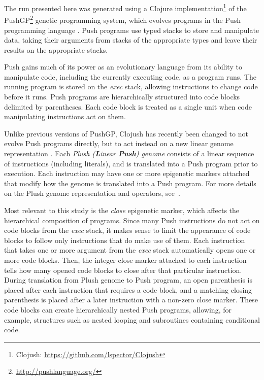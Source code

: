 \documentclass[graybox]{svmult}
\begin{document}


The run presented here was generated using a Clojure implementation\footnote{Clojush: \url{https://github.com/lspector/Clojush}} of the PushGP\footnote{\url{http://pushlanguage.org/}} genetic programming system, which evolves programs in the Push programming language \cite{spector:2002:GPEM, 1068292}. Push programs use typed stacks to store and manipulate data, taking their arguments from stacks of the appropriate types and leave their results on the appropriate stacks.

Push gains much of its power as an evolutionary language from its ability to manipulate code, including the currently executing code, as a program runs. The running program is stored on the \textit{exec} stack, allowing instructions to change code before it runs. Push programs are hierarchically structured into code blocks delimited by parentheses. Each code block is treated as a single unit when code manipulating instructions act on them.

Unlike previous versions of PushGP, Clojush has recently been changed to not evolve 
Push programs directly, but to act instead on a new linear genome representation 
\cite{Helmuth:2016:GPTP}. Each \textit{Plush (\textbf{L}inear 
	\textbf{Push}) genome} consists of a linear sequence of instructions (including 
literals), and is translated into a Push program prior to execution. Each 
instruction may have one or more epigenetic markers attached that modify how 
the genome is translated into a Push program. For more details on the Plush genome
representation and operators, see~\cite{Helmuth:2016:GPTP}.

Most relevant to this study is the \textit{close} epigenetic marker, which 
affects the hierarchical composition of programs. Since many Push instructions 
do not act on code blocks from the \textit{exec} stack, it 
makes sense to limit the appearance of code blocks to follow only instructions 
that do make use of them. Each instruction that takes one or more argument from 
the \textit{exec} stack automatically opens one or more code blocks. Then, the 
integer close marker attached to each instruction tells how many opened code 
blocks to close after that particular instruction. During translation from Plush genome to 
Push program, an open parenthesis is placed after each instruction that 
requires a code block, and a matching closing parenthesis is placed after a 
later instruction with a non-zero close marker. These code blocks can create 
hierarchically nested Push programs, allowing, for example, structures such as 
nested looping and subroutines containing conditional code.
\end{document}

